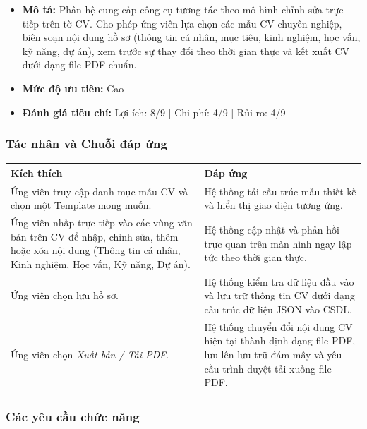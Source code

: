 \begin{itemize}
  \item \textbf{Mô tả:} Phân hệ cung cấp công cụ tương tác theo mô hình chỉnh sửa trực tiếp trên tờ CV. Cho phép ứng viên lựa chọn các mẫu CV chuyên nghiệp, biên soạn nội dung hồ sơ (thông tin cá nhân, mục tiêu, kinh nghiệm, học vấn, kỹ năng, dự án), xem trước sự thay đổi theo thời gian thực và kết xuất CV dưới dạng file PDF chuẩn.
  \item \textbf{Mức độ ưu tiên:} Cao
  \item \textbf{Đánh giá tiêu chí:} Lợi ích: 8/9 | Chi phí: 4/9 | Rủi ro: 4/9
\end{itemize}

\subsubsection{Tác nhân và Chuỗi đáp ứng}

\noindent
\begin{tabularx}{\textwidth}{|L{6cm}|X|}
    \hline
    \textbf{Kích thích} & \textbf{Đáp ứng} \\ \hline
    Ứng viên truy cập danh mục mẫu CV và chọn một Template mong muốn. & Hệ thống tải cấu trúc mẫu thiết kế và hiển thị giao diện tương ứng. \\ \hline
    Ứng viên nhấp trực tiếp vào các vùng văn bản trên CV để nhập, chỉnh sửa, thêm hoặc xóa nội dung (Thông tin cá nhân, Kinh nghiệm, Học vấn, Kỹ năng, Dự án). & Hệ thống cập nhật và phản hồi trực quan trên màn hình ngay lập tức theo thời gian thực. \\ \hline
    Ứng viên chọn lưu hồ sơ. & Hệ thống kiểm tra dữ liệu đầu vào và lưu trữ thông tin CV dưới dạng cấu trúc dữ liệu JSON vào CSDL. \\ \hline
    Ứng viên chọn \textit{Xuất bản / Tải PDF}. & Hệ thống chuyển đổi nội dung CV hiện tại thành định dạng file PDF, lưu lên lưu trữ đám mây và yêu cầu trình duyệt tải xuống file PDF. \\ \hline
\end{tabularx}

\subsubsection{Các yêu cầu chức năng}

